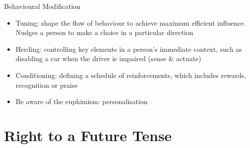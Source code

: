\documentclass[aspectratio=169]{beamer}
\begin{document}
    {%
    \begin{frame}{Behavioural Modification}
        \begin{itemize}
            \item Tuning: shape the flow of behaviour to achieve maximum
                efficient influence. \alert{Nudges} a person to make a choice
                in a particular direction
            \pause{}
            \item Herding: controlling key elements in a person's immediate
                context, such as disabling a car when the driver is impaired
                (sense \& actuate)
            \pause{}
            \item Conditioning: defining a schedule of reinforcements, which
                includes rewards, recognition or praise
            \pause{}
            \item Be aware of the euphimism: \alert{personalisation}
        \end{itemize}
    \end{frame}
    }

    \section{Right to a Future Tense}%
    \label{sec:right_to_a_future_tense}
\end{document}
